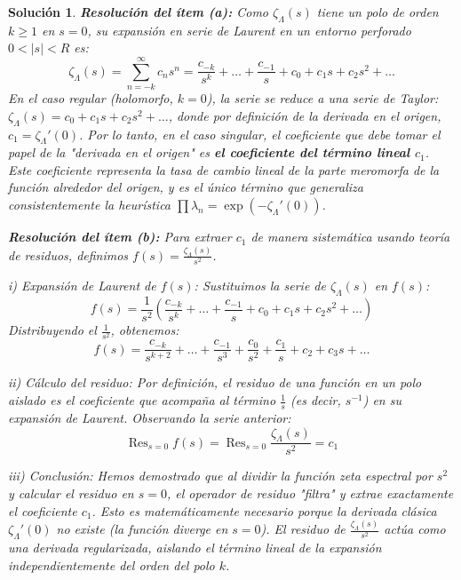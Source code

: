 \documentclass[12pt,a4paper]{article}
\newtheorem{sol}{Solución}
\newcommand{\Res}{\operatorname{Res}}
\begin{document}
\begin{sol}

\textbf{Resolución del ítem (a):}
Como $\zeta_{\Lambda}(s)$ tiene un polo de orden $k \ge 1$ en $s=0$, su expansión en serie de Laurent en un entorno perforado $0 < |s| < R$ es:
\begin{equation}
    \zeta_{\Lambda}(s) = \sum_{n=-k}^{\infty} c_n s^n = \frac{c_{-k}}{s^k} + \dots + \frac{c_{-1}}{s} + c_0 + c_1 s + c_2 s^2 + \dots
\end{equation}
En el caso regular (holomorfo, $k=0$), la serie se reduce a una serie de Taylor: $\zeta_{\Lambda}(s) = c_0 + c_1 s + c_2 s^2 + \dots$, donde por definición de la derivada en el origen, $c_1 = \zeta_{\Lambda}'(0)$. 
Por lo tanto, en el caso singular, el coeficiente que debe tomar el papel de la "derivada en el origen" es \textbf{el coeficiente del término lineal $c_1$}. Este coeficiente representa la tasa de cambio lineal de la parte meromorfa de la función alrededor del origen, y es el único término que generaliza consistentemente la heurística $\prod \lambda_n = \exp(-\zeta_{\Lambda}'(0))$.

\vspace{0.3cm}
\textbf{Resolución del ítem (b):}
Para extraer $c_1$ de manera sistemática usando teoría de residuos, definimos $f(s) = \frac{\zeta_{\Lambda}(s)}{s^2}$.

\textit{i) Expansión de Laurent de $f(s)$:}
Sustituimos la serie de $\zeta_{\Lambda}(s)$ en $f(s)$:
\begin{equation}
    f(s) = \frac{1}{s^2} \left( \frac{c_{-k}}{s^k} + \dots + \frac{c_{-1}}{s} + c_0 + c_1 s + c_2 s^2 + \dots \right)
\end{equation}
Distribuyendo el $\frac{1}{s^2}$, obtenemos:
\begin{equation}
    f(s) = \frac{c_{-k}}{s^{k+2}} + \dots + \frac{c_{-1}}{s^3} + \frac{c_0}{s^2} + \frac{c_1}{s} + c_2 + c_3 s + \dots
\end{equation}

\textit{ii) Cálculo del residuo:}
Por definición, el residuo de una función en un polo aislado es el coeficiente que acompaña al término $\frac{1}{s}$ (es decir, $s^{-1}$) en su expansión de Laurent. Observando la serie anterior:
\begin{equation}
    \Res_{s=0} f(s) = \Res_{s=0} \frac{\zeta_{\Lambda}(s)}{s^2} = c_1
\end{equation}

\textit{iii) Conclusión:}
Hemos demostrado que al dividir la función zeta espectral por $s^2$ y calcular el residuo en $s=0$, el operador de residuo "filtra" y extrae exactamente el coeficiente $c_1$. Esto es matemáticamente necesario porque la derivada clásica $\zeta_{\Lambda}'(0)$ no existe (la función diverge en $s=0$). El residuo de $\frac{\zeta_{\Lambda}(s)}{s^2}$ actúa como una derivada regularizada, aislando el término lineal de la expansión independientemente del orden del polo $k$.


\end{sol}
\end{document}
